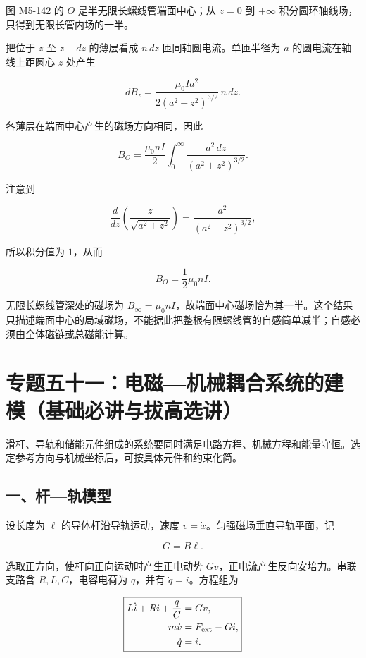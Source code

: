 图 M5-142 的 \(O\) 是半无限长螺线管端面中心；从 \(z=0\) 到 \(+\infty\)
积分圆环轴线场，只得到无限长管内场的一半。

把位于 \(z\) 至 \(z+dz\) 的薄层看成 \(n\,dz\) 匝同轴圆电流。单匝半径为
\(a\) 的圆电流在轴线上距圆心 \(z\) 处产生

\[
dB_z
=\frac{\mu_0I a^2}{2(a^2+z^2)^{3/2}}\,n\,dz.
\]

各薄层在端面中心产生的磁场方向相同，因此

\[
B_O
=\frac{\mu_0nI}{2}
\int_0^{\infty}
\frac{a^2\,dz}{(a^2+z^2)^{3/2}}.
\]

注意到

\[
\frac{d}{dz}\left(\frac{z}{\sqrt{a^2+z^2}}\right)
=\frac{a^2}{(a^2+z^2)^{3/2}},
\]

所以积分值为 \(1\)，从而

\[
\boxed{B_O=\frac12\mu_0nI}.
\]

无限长螺线管深处的磁场为
\(B_{\infty}=\mu_0nI\)，故端面中心磁场恰为其一半。这个结果只描述端面中心的局域磁场，不能据此把整根有限螺线管的自感简单减半；自感必须由全体磁链或总磁能计算。

\section{专题五十一：电磁---机械耦合系统的建模（基础必讲与拔高选讲）}\label{m5:ux4e13ux9898ux4e94ux5341ux4e00ux7535ux78c1ux673aux68b0ux8026ux5408ux7cfbux7edfux7684ux5efaux6a21ux57faux7840ux5fc5ux8bb2ux4e0eux62d4ux9ad8ux9009ux8bb2}

滑杆、导轨和储能元件组成的系统要同时满足电路方程、机械方程和能量守恒。选定参考方向与机械坐标后，可按具体元件和约束化简。

\subsection{一、杆---轨模型}\label{m5:ux4e00ux6746ux8f68ux6a21ux578b}

设长度为 \(\ell\) 的导体杆沿导轨运动，速度
\(v=\dot x\)。匀强磁场垂直导轨平面，记

\[
G=B\ell.
\]

选取正方向，使杆向正向运动时产生正电动势
\(Gv\)，正电流产生反向安培力。串联支路含 \(R,L,C\)，电容电荷为
\(q\)，并有 \(\dot q=i\)。方程组为

\[
\boxed{
\begin{aligned}
L\dot i+Ri+\frac qC&=Gv,\\
m\dot v&=F_{\rm ext}-Gi,\\
\dot q&=i.
\end{aligned}}
\]

